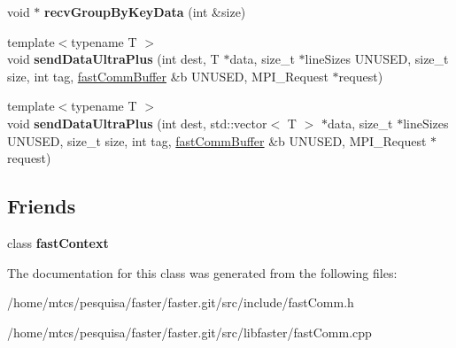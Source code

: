 \begin{DoxyCompactItemize}
\item 
\hypertarget{classfaster_1_1fastComm_a9d67334dcf7d808ab53c7e608f80778f}{}void $\ast$ {\bfseries recv\+Group\+By\+Key\+Data} (int \&size)\label{classfaster_1_1fastComm_a9d67334dcf7d808ab53c7e608f80778f}

\item 
\hypertarget{classfaster_1_1fastComm_a5572027981936643d12277c7e47bf54d}{}{\footnotesize template$<$typename T $>$ }\\void {\bfseries send\+Data\+Ultra\+Plus} (int dest, T $\ast$data, size\+\_\+t $\ast$line\+Sizes U\+N\+U\+S\+E\+D, size\+\_\+t size, int tag, \hyperlink{classfaster_1_1fastCommBuffer}{fast\+Comm\+Buffer} \&b U\+N\+U\+S\+E\+D, M\+P\+I\+\_\+\+Request $\ast$request)\label{classfaster_1_1fastComm_a5572027981936643d12277c7e47bf54d}

\item 
\hypertarget{classfaster_1_1fastComm_a2dce32a93a8a66e22d5e8caf650dd83c}{}{\footnotesize template$<$typename T $>$ }\\void {\bfseries send\+Data\+Ultra\+Plus} (int dest, std\+::vector$<$ T $>$ $\ast$data, size\+\_\+t $\ast$line\+Sizes U\+N\+U\+S\+E\+D, size\+\_\+t size, int tag, \hyperlink{classfaster_1_1fastCommBuffer}{fast\+Comm\+Buffer} \&b U\+N\+U\+S\+E\+D, M\+P\+I\+\_\+\+Request $\ast$request)\label{classfaster_1_1fastComm_a2dce32a93a8a66e22d5e8caf650dd83c}

\end{DoxyCompactItemize}
\subsection*{Friends}
\begin{DoxyCompactItemize}
\item 
\hypertarget{classfaster_1_1fastComm_a8ffe9636e25b4912700710d5fd2b5a2a}{}class {\bfseries fast\+Context}\label{classfaster_1_1fastComm_a8ffe9636e25b4912700710d5fd2b5a2a}

\end{DoxyCompactItemize}


The documentation for this class was generated from the following files\+:\begin{DoxyCompactItemize}
\item 
/home/mtcs/pesquisa/faster/faster.\+git/src/include/fast\+Comm.\+h\item 
/home/mtcs/pesquisa/faster/faster.\+git/src/libfaster/fast\+Comm.\+cpp\end{DoxyCompactItemize}

